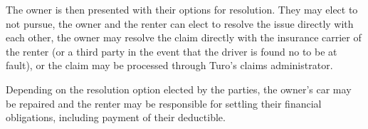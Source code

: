 \documentclass[preprint,12pt]{elsarticle}
\begin{document}
The owner is then presented with their options for resolution. They may elect to not pursue, the owner and the renter can elect to resolve the issue directly with each other, the owner may resolve the claim directly with the insurance carrier of the renter (or a third party in the event that the driver is found no to be at fault), or the claim may be processed through Turo's claims administrator.

Depending on the resolution option elected by the parties, the owner's car may be repaired and the renter may be responsible for settling their financial obligations, including payment of their deductible.















\end{document}
